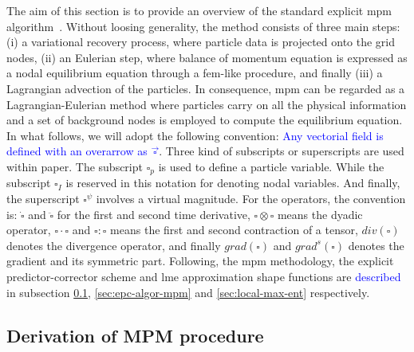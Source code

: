 \documentclass[preprint,12pt,a4paper]{elsarticle}
\newcommand{\Div}[1]{
  \ensuremath{div({#1})}
}
\newcommand\Grad[1]{grad({#1})}
\newcommand\GradS[1]{grad^s({#1})}
\begin{document}
The aim of this section is to provide an overview of the standard
explicit \acrshort{mpm} algorithm~\cite{Sulsky1994}. Without loosing
generality, the method consists of three main steps: (i) a
variational recovery process, where particle data is projected onto the
grid nodes, (ii) an Eulerian step, where balance of momentum equation
is expressed as a nodal equilibrium equation through a \acrshort{fem}-like
procedure, and finally (iii) a Lagrangian advection of the
particles. In consequence, \acrshort{mpm} can be regarded as a
Lagrangian-Eulerian method where particles carry on all the physical
information and a set of background nodes is employed to
compute the equilibrium equation. In what follows, we will adopt the
following convention: \textcolor{blue}{Any vectorial field is defined with an overarrow as $\vec{\square}$}. Three kind of subscripts or superscripts are used within paper. The subscript $\square_p$ is used to define a particle
variable. While the subscript $\square_I$ is reserved in this notation for denoting nodal
variables. And finally, the superscript $\square^{\psi}$ involves a
virtual magnitude. For the operators, the convention is: $\dot{\square}$ and
$\ddot{\square}$ for the first and second time derivative, $\square \otimes
\square$ means the dyadic operator, $\square \cdot \square$ and $\square \colon \square$ means the
first and second contraction of a tensor, $\Div{\square}$ denotes the
divergence operator, and finally $\Grad{\square}$ and $\GradS{\square}$ denotes the gradient and its symmetric part. Following, the \acrshort{mpm} methodology, the explicit predictor-corrector scheme and \acrshort{lme} approximation shape functions are \textcolor{blue}{described} in subsection \ref{sec:derivation-mpm}, \ref{sec:epc-algor-mpm} and \ref{sec:local-max-ent} respectively.

\subsection{Derivation of MPM procedure}
\label{sec:derivation-mpm}
\end{document}
